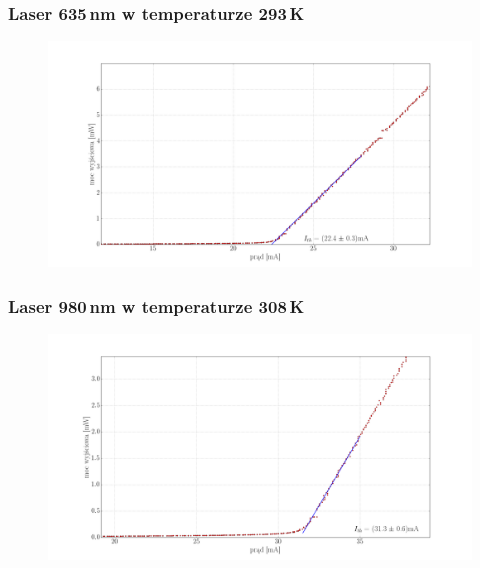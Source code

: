 \documentclass[xcolor={dvipsnames,table}]{beamer}
\begin{document}
\begin{frame}
\frametitle{Laser 635\,nm w temperaturze 293\,K}
\center
\begin{figure}
   \includegraphics[width=1.10\textwidth,natwidth=69,natheight=87]{635/plot_i_th_20.png}
\end{figure}
\end{frame}

\begin{frame}
\frametitle{Laser 980\,nm w temperaturze 308\,K}
\center
\begin{figure}
   \includegraphics[width=1.10\textwidth,natwidth=69,natheight=87]{635/plot_i_th_35.png}
\end{figure}
\end{frame}
\end{document}
